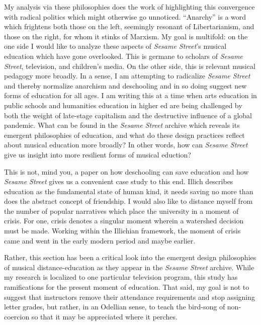 \documentclass[12pt,letterpaper]{article}
\newcommand{\ses}{\textit{Sesame Street }}
\begin{document}
	My analysis via these philosophies does the work of highlighting this 
	convergence with radical politics which might otherwise go unnoticed. 
	``Anarchy'' is a word which frightens both those on the left, seemingly
	 resonant of Libertarianism, and those on the right, for whom it stinks 
	of Marxism. My goal is multifold: on the one side I would like to 
	analyze these aspects of \textit{Sesame Street}’s musical education 
	which have gone overlooked. This is germane to scholars of 
	\textit{Sesame Street}, television, and children’s media. On the other 
	side, this is relevant musical pedagogy more broadly. In a sense,
 	I am attempting to radicalize \ses and thereby normalize anarchism and 
	deschooling and in so doing suggest new forms of education for all ages. 
	I am writing this at a time when arts education in public schools and 
	humanities education in higher ed are being challenged by both the 
	weight of late-stage capitalism and the destructive influence of a 
	global pandemic. What can be found in the \ses archive which 
	reveals its emergent philosophies of education, and what do these 
	design 	practices reflect about musical education more broadly? 
	In other words, how can \ses give us insight into more resilient forms
	of musical eduction?

	This is not, mind you, a paper on how deschooling can save education and
 	how \ses gives us a convenient case study to this end. Illich 
	describes education as the fundamental state of human kind, it needs
	saving no more than does the abstract concept of friendship. I would 
	also 
	like to distance myself from the number of popular narratives which 
	place the university in a moment of crisis. For one, crisis denotes 
	a singular moment wherein a watershed decision must be made. Working 
	within the Illichian framework, the moment of crisis came and went in 
	the early modern period and maybe earlier.

	Rather, this section has been a critical look into the emergent design 
	philosophies of musical distance-education as they appear in the \ses 
	archive. While my research is localized to one particular television 
	program, this study has ramifications for the present moment of 
	education. That said, my goal is not to suggest that instructors remove 
	their attendance requirements and stop assigning letter grades, but 
	rather, in an Odellian sense, to teach the bird-song of non-coercion 
	so that it may be appreciated where it perches.
\end{document}
